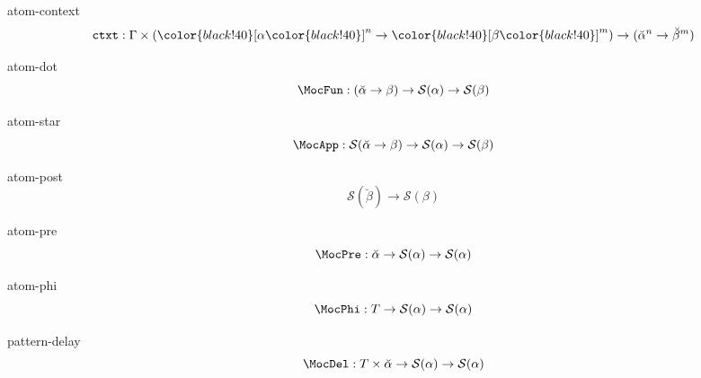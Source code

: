 \documentclass[preview]{standalone}
\begin{document}
\begin{docimage}{atom-context}
  \begin{equation*}%
    \mathtt{ctxt} : \Gamma \times ({\color{black!40}[}\alpha{\color{black!40}]}^n \rightarrow {\color{black!40}[}\beta{\color{black!40}]}^m )
    \rightarrow ({\breve{\alpha}^n \rightarrow \breve{\beta}^m})
  \end{equation*}
\end{docimage} 

\begin{docimage}{atom-dot}
  \begin{equation*}%
    \MocFun :
    ({\breve{\alpha} \rightarrow \beta})
    \rightarrow \mathcal{S}(\alpha) \rightarrow \mathcal{S}(\beta)
  \end{equation*}
\end{docimage} 

\begin{docimage}{atom-star}
  \begin{equation*}%
    \MocApp :
    \mathcal{S}({\breve{\alpha} \rightarrow \beta})
    \rightarrow \mathcal{S}(\alpha) \rightarrow \mathcal{S}(\beta)
  \end{equation*}
\end{docimage}

\begin{docimage}{atom-post}
  \begin{equation*}%
    \mathcal{S}({\breve{\beta}})
    \rightarrow \mathcal{S}(\beta)
  \end{equation*}
\end{docimage}

\begin{docimage}{atom-pre}
  \begin{equation*}%
    \MocPre :
    \breve{\alpha}
    \rightarrow \mathcal{S}(\alpha) \rightarrow \mathcal{S}(\alpha)
  \end{equation*}
\end{docimage}

\begin{docimage}{atom-phi}
  \begin{equation*}%
    \MocPhi :
    T
    \rightarrow \mathcal{S}(\alpha) \rightarrow \mathcal{S}(\alpha)
  \end{equation*}
\end{docimage}


\begin{docimage}{pattern-delay}
  \begin{equation*}%
    \MocDel :
    T \times \breve{\alpha}
    \rightarrow \mathcal{S}(\alpha) \rightarrow \mathcal{S}(\alpha)
  \end{equation*}
\end{docimage}
\end{document}
